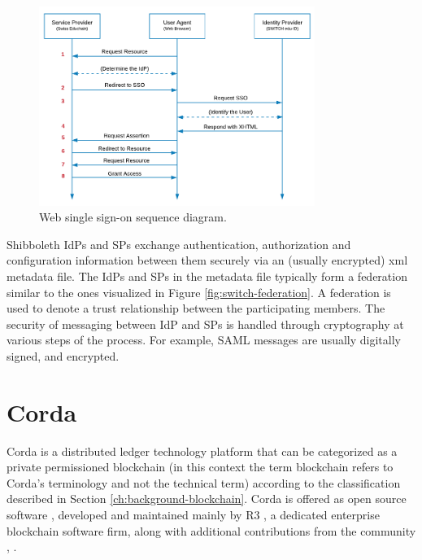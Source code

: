 \begin{figure}[H]
	\centering
	\captionsetup{width=.8\linewidth}
	\includegraphics[width=0.8\textwidth]{figs/ch3/web-sso-diagram}
	\caption{Web single sign-on sequence diagram.}
	\label{fig:sso-diagram}
\end{figure} 

Shibboleth IdPs and SPs exchange authentication, authorization and configuration information between them securely via an (usually encrypted) xml metadata file. The IdPs and SPs in the metadata file typically form a federation similar to the ones visualized in Figure \ref{fig:switch-federation}. A federation is used to denote a trust relationship between the participating members. The security of messaging between IdP and SPs is handled through cryptography at various steps of the process. For example, SAML messages are usually digitally signed, and encrypted. \cite{sso-shibboleth-toronto}


\section{Corda} \label{sec:corda}

Corda is a distributed ledger technology platform that can be categorized as a private permissioned blockchain (in this context the term blockchain refers to Corda's terminology and not the technical term) according to the classification described in Section \ref{ch:background-blockchain}. Corda is offered as open source software \cite{corda-github}, developed and maintained mainly by R3 \cite{r3-website}, a dedicated enterprise blockchain software firm, along with additional contributions from the community \cite{corda-contributions}, \cite{corda-community}.

